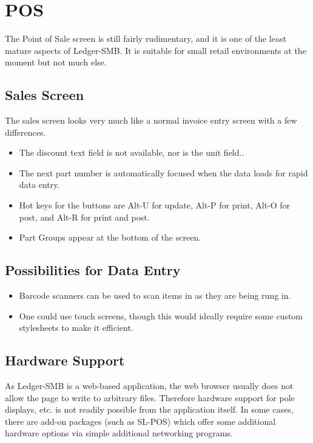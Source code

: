 \documentclass{article}
\begin{document}
\section{POS}

The Point of Sale screen is still fairly rudimentary, and it is one of the least
mature aspects of Ledger-SMB.  It is suitable for small retail environments at
the moment but not much else.

\subsection{Sales Screen}
The sales screen looks very much like a normal invoice entry screen with a few
differences.

\begin{itemize}
\item The discount text field is not available, nor is the unit field..
\item The next part number is automatically focused when the data loads for
rapid data entry.
\item Hot keys for the buttons are Alt-U for update, Alt-P for print, Alt-O for
post, and Alt-R for print and post.
\item Part Groups appear at the bottom of the screen.
\end{itemize}

\subsection{Possibilities for Data Entry}
\begin{itemize}
\item Barcode scanners can be used to scan items in as they are being rung in.
\item One could use touch screens, though this would ideally require some custom
stylesheets to make it efficient.
\end{itemize}

\subsection{Hardware Support}
As Ledger-SMB is a web-based application, the web browser usually does not allow
the page to write to arbitrary files.  Therefore hardware support for pole
displays, etc. is not readily possible from the application itself.  In some
cases, there are add-on packages (such as SL-POS) which offer some additional
hardware options via simple additional networking programs.
\end{document}
